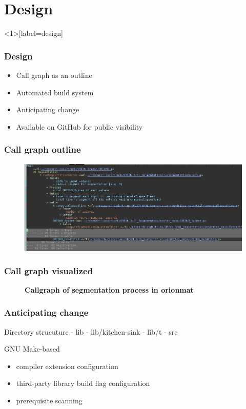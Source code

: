 \documentclass{beamer}
\begin{document}
\section{Design}

\begin{frame}<1>[label=design]\frametitle{Design}
\begin{itemize}
	\item<1> Call graph as an outline
	\item<2> Automated build system
	\item<3> Anticipating change
	\item<3> Available on GitHub for public visibility
\end{itemize}
\end{frame}

\begin{frame}\frametitle{Call graph outline}
\begin{figure}
\centering
\includegraphics[width=1.0\textwidth]{gfx/call-graph-outline}
\end{figure}
\end{frame}

\begin{frame}\frametitle{Call graph visualized}
\begin{figure}
\centering
\resizebox{0.8\textwidth}{!}{}
\caption[Callgraph of segmentation process in ]{
\textbf{\boldmath{} Callgraph of segmentation process in \gls{orionmat}}
}\label{fig:orionmat-segmentation}
\end{figure}
\end{frame}



\begin{frame}\frametitle{Anticipating change}
	Directory strucuture
- lib
- lib/kitchen-sink
- lib/t
- src
\end{frame}

\begin{frame}
	GNU Make-based 
	\begin{itemize}
		\item compiler extension configuration
		\item third-party library build flag configuration
		\item prerequisite scanning
	\end{itemize}
\end{frame}
\end{document}
